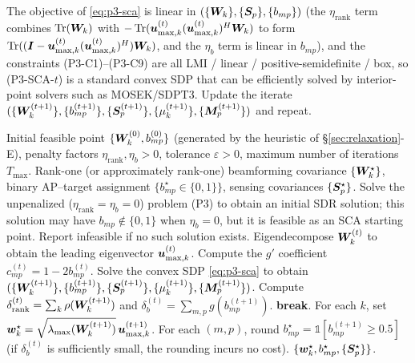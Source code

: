 The objective of \eqref{eq:p3-sca} is linear in $(\{\bm{W}_k\}, \{\bm{S}_p\}, \{b_{mp}\})$ (the $\eta_{\text{rank}}$ term combines $\operatorname{Tr}(\bm{W}_k)$ with $-\operatorname{Tr}(\bm{u}_{\max,k}^{(t)}(\bm{u}_{\max,k}^{(t)})^H \bm{W}_k)$ to form $\operatorname{Tr}((\bm{I} - \bm{u}_{\max,k}^{(t)}(\bm{u}_{\max,k}^{(t)})^H) \bm{W}_k)$, and the $\eta_b$ term is linear in $b_{mp}$), and the constraints (P3-C1)--(P3-C9) are all LMI / linear / positive-semidefinite / box, so (P3-SCA-$t$) is a standard convex SDP that can be efficiently solved by interior-point solvers such as MOSEK/SDPT3. Update the iterate $(\{\bm{W}_k^{(t+1)}\}, \{b_{mp}^{(t+1)}\}, \{\bm{S}_p^{(t+1)}\}, \{\mu_k^{(t+1)}\}, \{\bm{M}_p^{(t+1)}\})$ and repeat.

\begin{algorithm}[htbp]
\caption{Dual DC Penalty SCA Iteration (Joint Rank-One and Binary Recovery)}
\label{alg:sca-joint}
\begin{algorithmic}[1]
\Require Initial feasible point $\{\bm{W}_k^{(0)}, b_{mp}^{(0)}\}$ (generated by the heuristic of \S\ref{sec:relaxation}-E), penalty factors $\eta_{\text{rank}}, \eta_b > 0$, tolerance $\varepsilon > 0$, maximum number of iterations $T_{\max}$.
\Ensure Rank-one (or approximately rank-one) beamforming covariance $\{\bm{W}_k^\star\}$, binary AP--target assignment $\{b_{mp}^\star \in \{0,1\}\}$, sensing covariances $\{\bm{S}_p^\star\}$.
\State Solve the unpenalized ($\eta_{\text{rank}} = \eta_b = 0$) problem (P3) to obtain an initial SDR solution; this solution may have $b_{mp} \notin \{0,1\}$ when $\eta_b = 0$, but it is feasible as an SCA starting point. Report infeasible if no such solution exists.
        \State Eigendecompose $\bm{W}_k^{(t)}$ to obtain the leading eigenvector $\bm{u}_{\max,k}^{(t)}$.
    \EndFor
        \State Compute the $g'$ coefficient $c_{mp}^{(t)} = 1 - 2 b_{mp}^{(t)}$.
    \EndFor
    \State Solve the convex SDP \eqref{eq:p3-sca} to obtain $(\{\bm{W}_k^{(t+1)}\}, \{b_{mp}^{(t+1)}\}, \{\bm{S}_p^{(t+1)}\}, \{\mu_k^{(t+1)}\}, \{\bm{M}_p^{(t+1)}\})$.
    \State Compute $\delta_{\text{rank}}^{(t)} = \sum_k \rho(\bm{W}_k^{(t+1)})$ and $\delta_b^{(t)} = \sum_{m,p} g(b_{mp}^{(t+1)})$.
        \State \textbf{break}.
    \EndIf
\EndFor
\State For each $k$, set $\bm{w}_k^\star = \sqrt{\lambda_{\max}(\bm{W}_k^{(t+1)})} \, \bm{u}_{\max,k}^{(t+1)}$.
\State For each $(m, p)$, round $b_{mp}^\star = \mathbb{1}[b_{mp}^{(t+1)} \geq 0.5]$ (if $\delta_b^{(t)}$ is sufficiently small, the rounding incurs no cost).
\State \Return $\{\bm{w}_k^\star, b_{mp}^\star, \{\bm{S}_p^\star\}\}$.
\end{algorithmic}
\end{algorithm}

